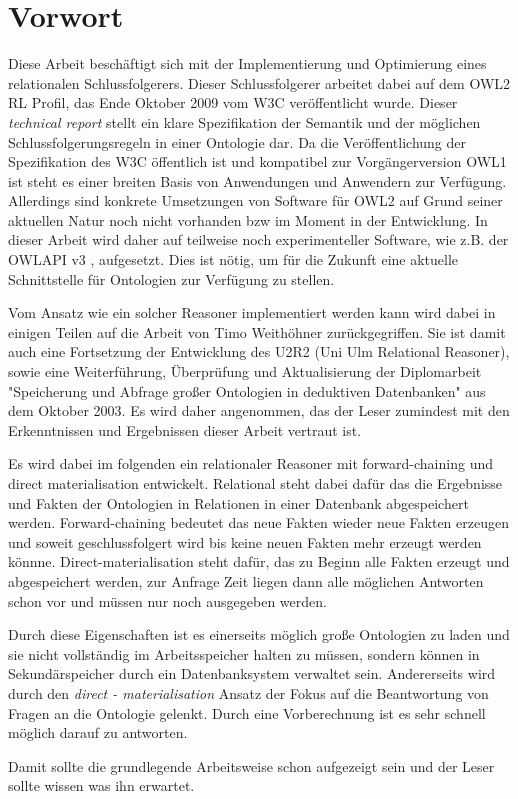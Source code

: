 \section*{Vorwort}
Diese Arbeit beschäftigt sich mit der Implementierung und Optimierung eines relationalen Schlussfolgerers. Dieser Schlussfolgerer arbeitet dabei auf dem OWL2 RL Profil, das Ende Oktober 2009 vom W3C \cite{OWL2Profiles} veröffentlicht wurde. Dieser \emph{technical report} stellt ein klare Spezifikation der Semantik und der möglichen Schlussfolgerungsregeln in einer Ontologie dar. Da die Veröffentlichung der Spezifikation des W3C öffentlich ist und kompatibel zur Vorgängerversion OWL1 \cite{OWL1} ist steht es einer breiten Basis von Anwendungen und Anwendern zur Verfügung. Allerdings sind konkrete Umsetzungen von Software für OWL2 auf Grund seiner aktuellen Natur noch nicht vorhanden bzw im Moment in der Entwicklung. In dieser Arbeit wird daher auf teilweise noch experimenteller Software, wie z.B. der OWLAPI v3 \cite{OWLAPI}, aufgesetzt. Dies ist nötig, um für die Zukunft eine aktuelle Schnittstelle für Ontologien zur Verfügung zu stellen.

Vom Ansatz wie ein solcher Reasoner implementiert werden kann wird dabei in einigen Teilen auf die Arbeit von Timo Weithöhner zurückgegriffen. Sie ist damit auch eine Fortsetzung der Entwicklung des U2R2 (Uni Ulm Relational Reasoner), sowie eine Weiterführung, Überprüfung und Aktualisierung der Diplomarbeit "Speicherung und Abfrage großer Ontologien in deduktiven Datenbanken" aus dem Oktober 2003. Es wird daher angenommen, das der Leser zumindest mit den Erkenntnissen und Ergebnissen dieser Arbeit vertraut ist.

Es wird dabei im folgenden ein relationaler Reasoner mit forward-chaining und direct materialisation entwickelt. Relational steht dabei dafür das die Ergebnisse und Fakten der Ontologien in Relationen in einer Datenbank abgespeichert werden. Forward-chaining bedeutet das neue Fakten wieder neue Fakten erzeugen und soweit geschlussfolgert wird bis keine neuen Fakten mehr erzeugt werden könnne. Direct-materialisation steht dafür, das zu Beginn alle Fakten erzeugt und abgespeichert werden, zur Anfrage Zeit liegen dann alle möglichen Antworten schon vor und müssen nur noch ausgegeben werden.

Durch diese Eigenschaften ist es einerseits möglich große Ontologien zu laden und sie nicht vollständig im Arbeitsspeicher halten zu müssen, sondern können in Sekundärspeicher durch ein Datenbanksystem verwaltet sein. Andererseits wird durch den \emph{direct - materialisation} Ansatz der Fokus auf die Beantwortung von Fragen an die Ontologie gelenkt. Durch eine Vorberechnung ist es sehr schnell möglich darauf zu antworten.

Damit sollte die grundlegende Arbeitsweise schon aufgezeigt sein und der Leser sollte wissen was ihn erwartet.
